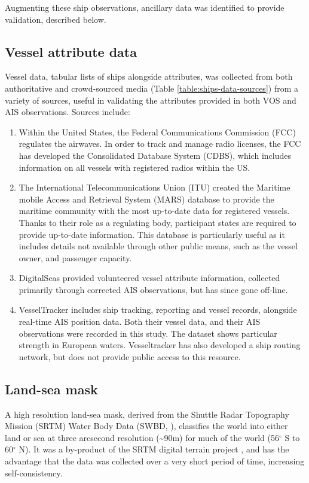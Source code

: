 Augmenting these ship observations, ancillary data was identified to provide validation, described below.

\subsection{Vessel attribute data}
Vessel data, tabular lists of ships alongside attributes, was collected from both authoritative and crowd-sourced media (Table \ref{table:ships-data-sources}) from a variety of sources, useful in validating the attributes provided in both VOS and AIS observations. Sources include:
\begin{enumerate}
  \item Within the United States, the Federal Communications Commission (FCC) regulates the airwaves. In order to track and manage radio licenses, the FCC has developed the Consolidated Database System (CDBS), which includes information on all vessels with registered radios within the US. 
  \item The International Telecommunications Union (ITU) created the Maritime mobile Access and Retrieval System (MARS) database to provide the maritime community with the most up-to-date data for registered vessels. Thanks to their role as a regulating body, participant states are required to provide up-to-date information. This database is particularly useful as it includes details not available through other public means, such as the vessel owner, and passenger capacity.
  \item DigitalSeas provided volunteered vessel attribute information, collected primarily through corrected AIS observations, but has since gone off-line.
  \item VesselTracker includes ship tracking, reporting and vessel records, alongside real-time AIS position data. Both their vessel data, and their AIS observations were recorded in this study. The dataset shows particular strength in European waters. Vesseltracker has also developed a ship routing network, but does not provide public access to this resource.
\end{enumerate}

\subsection{Land-sea mask}
\label{sec:land-sea-mask}
  A high resolution land-sea mask, derived from the Shuttle Radar Topography Mission (SRTM) Water Body Data (SWBD, \citealp{slater2006srtm}), classifies the world into either land or sea at three arcsecond resolution (\textasciitilde{}90m) for much of the world (56$^\circ$ S to 60$^\circ$ N). It was a by-product of the SRTM digital terrain project \citep{rabus2003shuttle}, and has the advantage that the data was collected over a very short period of time, increasing self-consistency.

